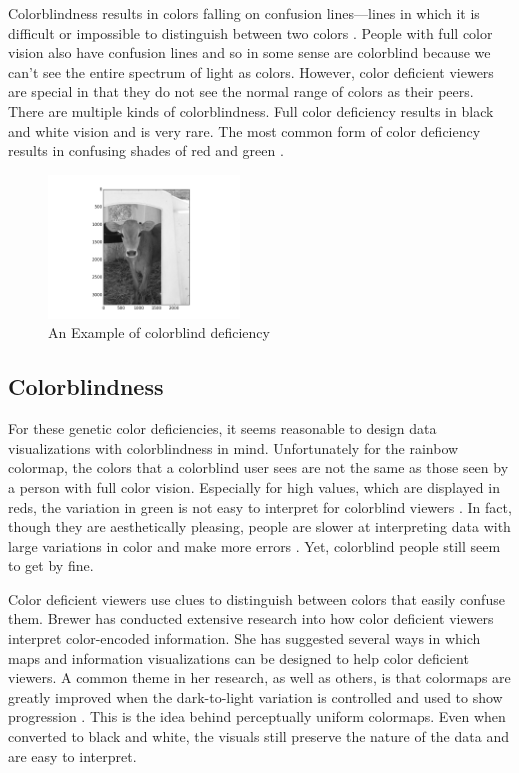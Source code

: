 \documentclass[journal,12pt]{IEEEtran}
\begin{document}
Colorblindness results in colors falling on confusion lines---lines in which it
is difficult or impossible to distinguish between two colors \cite{colormapping}. People with full
color vision also have confusion lines and so in some sense are colorblind because 
we can't see the entire spectrum of light as colors. However, color deficient viewers
are special in that they do not see the normal range of colors as their peers.
There are multiple kinds of colorblindness.
Full color deficiency results in black and white vision and is very rare.
The most common form of color deficiency results in confusing shades of red and green \cite{colorchoice}.
\begin{figure}
\centering
\includegraphics[width=2in]{calf_grey}%
\caption{An Example of colorblind deficiency}
\end{figure}

\subsection{Colorblindness}

For these genetic color deficiencies, it seems reasonable to design data
visualizations with colorblindness in mind. Unfortunately for the rainbow colormap,
the colors that a colorblind user sees are not the same as those seen by a person
with full color vision. Especially for high values, which are displayed in reds,
the variation in green is not easy to interpret for colorblind viewers \cite{cvimap}. In fact,
though they are aesthetically pleasing, people are slower at interpreting data with
large variations in color and make more errors \cite{arteryvis}. Yet, colorblind people still seem
to get by fine.

Color deficient viewers use clues to distinguish between colors that easily confuse them.
Brewer has conducted extensive research into how color deficient
viewers interpret color-encoded information. She has suggested several ways in which 
maps and information visualizations can be designed to help color deficient viewers.
A common theme in her research, as well as others, is that colormaps are greatly
improved when the dark-to-light variation is controlled and used to show progression \cite{cvimap}.
This is the idea behind perceptually uniform colormaps. Even when converted to black
and white, the visuals still preserve the nature of the data and are easy to interpret.
\end{document}
